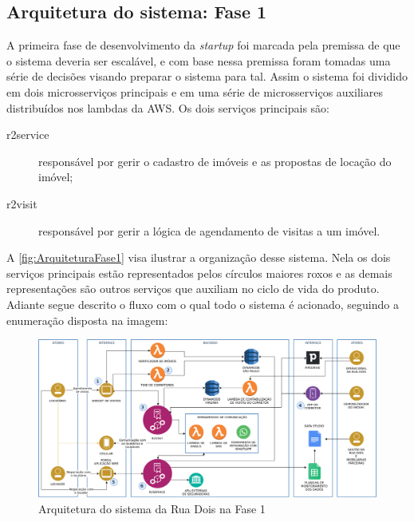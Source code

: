 \subsection{Arquitetura do sistema: Fase 1}
\label{sec:ArquiteturaFase1}

A primeira fase de desenvolvimento da \textit{startup} foi marcada pela premissa de
que o sistema deveria ser escalável, e com base nessa premissa foram tomadas uma
série de decisões visando preparar o sistema para tal. Assim o sistema foi dividido 
em dois microsserviços principais e em uma série de microsserviços auxiliares
distribuídos nos lambdas da \gls{AWS}. Os dois serviços principais são:

    \begin{description}
        \item [r2service] responsável por gerir o cadastro de imóveis e as propostas
        de locação do imóvel;
        \item [r2visit] responsável por gerir a lógica de agendamento de visitas
        a um imóvel.
    \end{description}

A \autoref{fig:ArquiteturaFase1} visa ilustrar a organização desse sistema. Nela
os dois serviços principais estão representados pelos círculos maiores roxos e as
demais representações são outros serviços que auxiliam no ciclo de vida do produto.
Adiante segue descrito o fluxo com o qual todo o sistema é acionado, seguindo a
enumeração disposta na imagem:

\begin{figure}[h]
  \centering
  \includegraphics[keepaspectratio=true,scale=0.4]{figuras/r2ArquiteturaFase1.eps}
  \caption{Arquitetura do sistema da Rua Dois na Fase 1\label{fig:ArquiteturaFase1}}
\end{figure}

